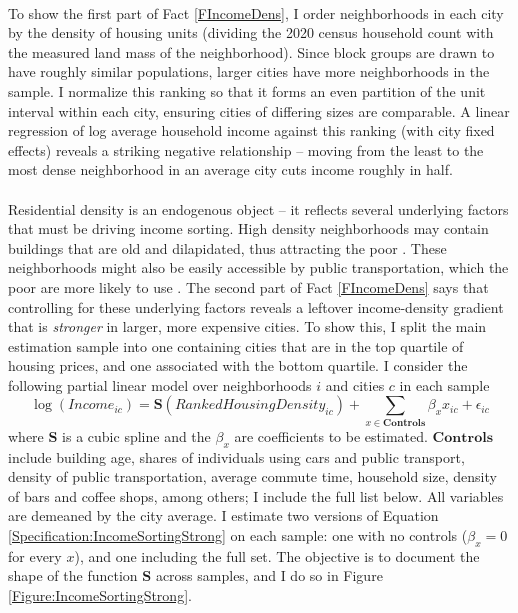 \documentclass[]{article}
\begin{document}
\paragraph*{}
To show the first part of Fact \ref{FIncomeDens}, I order neighborhoods in each city by the density of housing units (dividing the 2020 census household count with the measured land mass of the neighborhood). Since block groups are drawn to have roughly similar populations, larger cities have more neighborhoods in the sample. I normalize this ranking so that it forms an even partition of the unit interval within each city, ensuring cities of differing sizes are comparable. A linear regression of log average household income against this ranking (with city fixed effects) reveals a striking negative relationship -- moving from the least to the most dense neighborhood in an average city cuts income roughly in half. 

\paragraph*{}
Residential density is an endogenous object -- it reflects several underlying factors that must be driving income sorting. High density neighborhoods may contain buildings that are old and dilapidated, thus attracting the poor \citep{Gentrificationcycles}. These neighborhoods might also be easily accessible by public transportation, which the poor are more likely to use \citep{ccpoortransport}. The second part of Fact \ref{FIncomeDens} says that controlling for these underlying factors reveals a leftover income-density gradient that is \textit{stronger} in larger, more expensive cities. To show this, I split the main estimation sample into one containing cities that are in the top quartile of housing prices, and one associated with the bottom quartile. I consider the following partial linear model over neighborhoods $i$ and cities $c$ in each sample
\begin{equation}\label{Specification:IncomeSortingStrong}
	\log(Income_{ic}) = \mathbf{S}(RankedHousingDensity_{ic}) + \sum_{x \in \mathbf{Controls}}\beta_{x}x_{ic} + \epsilon_{ic}
\end{equation}
where $\mathbf{S}$ is a cubic spline and the $\beta_{x}$ are coefficients to be estimated. $\mathbf{Controls}$ include building age, shares of individuals using cars and public transport, density of public transportation, average commute time, household size, density of bars and coffee shops, among others; I include the full list below. All variables are demeaned by the city average. I estimate two versions of Equation \eqref{Specification:IncomeSortingStrong} on each sample: one with no controls ($\beta_{x} = 0$ for every $x$), and one including the full set. The objective is to document the shape of the function $\mathbf{S}$ across samples, and I do so in Figure \ref{Figure:IncomeSortingStrong}. 
\end{document}
